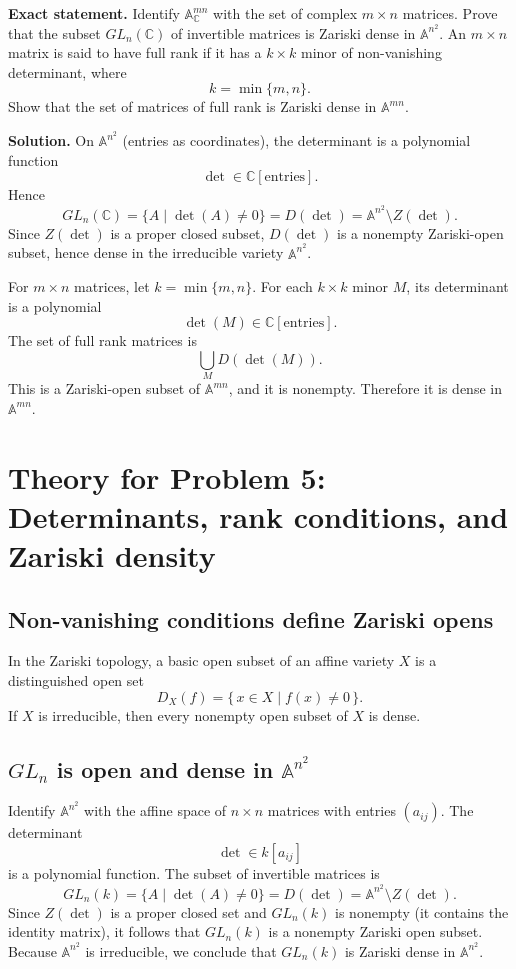 \documentclass[12pt,a4paper]{article}
\theoremstyle{plain}
\theoremstyle{definition}      %
\begin{document}
\textbf{Exact statement.}
Identify $\mathbb A^{mn}_{\mathbb C}$ with the set of complex $m\times n$ matrices.
Prove that the subset $GL_n(\mathbb C)$ of invertible matrices is Zariski dense in $\mathbb A^{n^2}$.
An $m\times n$ matrix is said to have full rank if it has a $k\times k$ minor of non-vanishing determinant,
where
\[
k
=
\min\{m,n\}.
\]
Show that the set of matrices of full rank is Zariski dense in $\mathbb A^{mn}$.

\textbf{Solution.}
On $\mathbb A^{n^2}$ (entries as coordinates), the determinant is a polynomial function
\[
\det
\in
\mathbb C[\text{entries}].
\]
Hence
\[
GL_n(\mathbb C)
=
\{A \mid \det(A)\neq 0\}
=
D(\det)
=
\mathbb A^{n^2}\setminus Z(\det).
\]
Since $Z(\det)$ is a proper closed subset, $D(\det)$ is a nonempty Zariski-open subset,
hence dense in the irreducible variety $\mathbb A^{n^2}$.

For $m\times n$ matrices, let $k=\min\{m,n\}$.
For each $k\times k$ minor $M$, its determinant is a polynomial
\[
\det(M)
\in
\mathbb C[\text{entries}].
\]
The set of full rank matrices is
\[
\bigcup_{M}
D(\det(M)).
\]
This is a Zariski-open subset of $\mathbb A^{mn}$, and it is nonempty.
Therefore it is dense in $\mathbb A^{mn}$.

\section*{Theory for Problem 5: Determinants, rank conditions, and Zariski density}

\subsection*{Non-vanishing conditions define Zariski opens}

In the Zariski topology, a basic open subset of an affine variety $X$ is a distinguished open set
\[
D_X(f)
=
\{\,x\in X\mid f(x)\neq 0\,\}.
\]
If $X$ is irreducible, then every nonempty open subset of $X$ is dense.

\subsection*{$GL_n$ is open and dense in $\mathbb A^{n^2}$}

Identify $\mathbb A^{n^2}$ with the affine space of $n\times n$ matrices with entries $(a_{ij})$.
The determinant
\[
\det
\in
k[a_{ij}]
\]
is a polynomial function.
The subset of invertible matrices is
\[
GL_n(k)
=
\{A\mid \det(A)\neq 0\}
=
D(\det)
=
\mathbb A^{n^2}\setminus Z(\det).
\]
Since $Z(\det)$ is a proper closed set and $GL_n(k)$ is nonempty (it contains the identity matrix), it follows that $GL_n(k)$ is a nonempty Zariski open subset.
Because $\mathbb A^{n^2}$ is irreducible, we conclude that $GL_n(k)$ is Zariski dense in $\mathbb A^{n^2}$.
\end{document}
